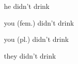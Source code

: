 \documentclass[avery5371,grid,frame]{flashcards}
\begin{document}
\begin{flashcard}{\LARGE he didn't drink}
\LARGE {}
\end{flashcard}
\begin{flashcard}{\LARGE you (fem.) didn't drink}
\LARGE {}
\end{flashcard}
\begin{flashcard}{\LARGE you (pl.) didn't drink}
\LARGE {}
\end{flashcard}
\begin{flashcard}{\LARGE they didn't drink}
\LARGE {}
\end{flashcard}
\end{document}
